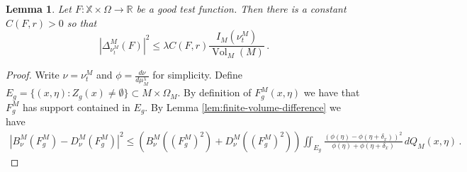 \documentclass[11pt]{amsart}
\newtheorem{lemma}[theorem]{Lemma}
\theoremstyle{definition}
\theoremstyle{remark}
\newcommand{\R}{\mathbb{R}}
\newcommand{\bX}{\mathbb{X}}
\newcommand{\Vol}{\operatorname{Vol}}
\begin{document}
\begin{lemma}\label{lem:finite-volume-dissipation}
    Let $F: \bX \times \Omega \to \R$ be a good test function.  Then there is a constant $C(F,r) > 0$ so that \begin{equation*}
        |\Delta_{\nu_t^M}^M(F)|^2 \leq  \lambda C(F,r) \frac{I_M(\nu_t^M)}{\Vol_M(M)} \,.
    \end{equation*}
\end{lemma}
\begin{proof}
	Write $\nu = \nu_t^M$ and $\phi = \frac{d\nu}{d \mu_M^\lambda}$ for simplicity.  Define $E_g = \{(x,\eta) : Z_g(x) \neq \emptyset\} \subset M\times \Omega_M$.  By definition of $F_g^M(x,\eta)$ we have that $F_{g}^M$ has support contained in $E_g$.  By Lemma \ref{lem:finite-volume-difference} we have \begin{align*}
		\left|B_{\nu}^M(F_g^M) - D_\nu^M(F_g^M) \right|^2 \leq  \left(B_\nu^M((F_g^M)^2) + D_\nu^M((F_g^M)^2) \right) \iint_{E_g} \frac{(\phi(\eta) - \phi(\eta + \delta_x))^2}{\phi(\eta) + \phi(\eta + \delta_x)} \,dQ_M(x,\eta)\,.
	\end{align*}


\end{proof}
\end{document}
